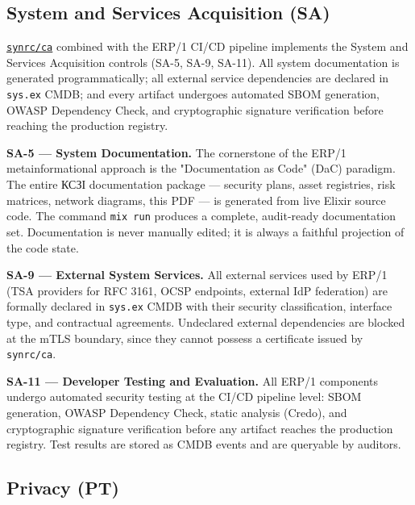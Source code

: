 \documentclass{article}
\begin{document}
\subsection{System and Services Acquisition (SA)}

\href{https://github.com/synrc/ca}{\texttt{synrc/ca}} combined with the ERP/1 CI/CD pipeline implements the System and Services Acquisition controls (SA-5, SA-9, SA-11). All system documentation is generated programmatically; all external service dependencies are declared in \texttt{sys.ex} CMDB; and every artifact undergoes automated SBOM generation, OWASP Dependency Check, and cryptographic signature verification before reaching the production registry.

\textbf{SA-5 --- System Documentation.}
The cornerstone of the ERP/1 metainformational approach is the "Documentation as Code" (DaC) paradigm. The entire \foreignlanguage{ukrainian}{КСЗІ} documentation package --- security plans, asset registries, risk matrices, network diagrams, this PDF --- is generated from live Elixir source code. The command \texttt{mix run} produces a complete, audit-ready documentation set. Documentation is never manually edited; it is always a faithful projection of the code state.

\textbf{SA-9 --- External System Services.}
All external services used by ERP/1 (TSA providers for RFC 3161, OCSP endpoints, external IdP federation) are formally declared in \texttt{sys.ex} CMDB with their security classification, interface type, and contractual agreements. Undeclared external dependencies are blocked at the mTLS boundary, since they cannot possess a certificate issued by \texttt{synrc/ca}.

\textbf{SA-11 --- Developer Testing and Evaluation.}
All ERP/1 components undergo automated security testing at the CI/CD pipeline level: SBOM generation, OWASP Dependency Check, static analysis (Credo), and cryptographic signature verification before any artifact reaches the production registry. Test results are stored as CMDB events and are queryable by auditors.

\subsection{Privacy (PT)}
\end{document}
